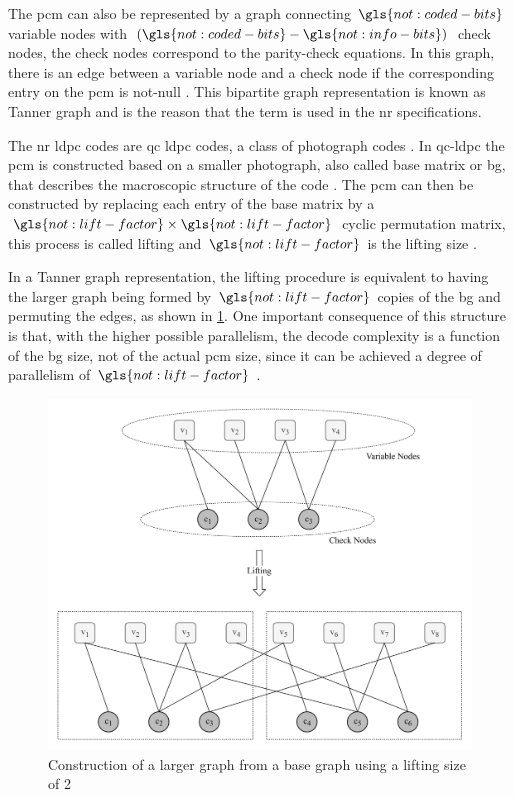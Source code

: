 The \gls{pcm} can also be represented by a graph connecting $\gls{not:coded-bits}$ variable nodes with $(\gls{not:coded-bits}-\gls{not:info-bits})$ check nodes, the check nodes correspond to the parity-check equations.
%
In this graph, there is an edge between a variable node and a check node if the corresponding entry on the \gls{pcm} is not-null \cite{Richardson2018}.
%
This bipartite graph representation is known as Tanner graph \cite{TannerGraph} and is the reason that the term  is used in the \gls{nr} specifications.
%


The \gls{nr} \gls{ldpc} codes are \gls{qc} \gls{ldpc} codes, a class of photograph codes \cite{bae_abotabl_lin_song_lee_2019}.
%
In \gls{qc}-\gls{ldpc} the \gls{pcm} is constructed based on a smaller photograph, also called base matrix or \gls{bg}, that describes the macroscopic structure of the code \cite{Richardson2018}.
%
The \gls{pcm} can then be constructed by replacing each entry of the base matrix by a $\gls{not:lift-factor} \times \gls{not:lift-factor} $ cyclic permutation matrix, this process is called lifting and $\gls{not:lift-factor}$ is the lifting size \cite{AliZaidi632018}.


In a Tanner graph representation, the lifting procedure is equivalent to having the larger graph being formed by $\gls{not:lift-factor}$ copies of the \gls{bg} and permuting the edges, as shown in \ref{fig:graph-lifting}.
%
One important consequence of this structure is that, with the higher possible parallelism, the decode complexity is a function of the \gls{bg} size, not of the actual \gls{pcm} size, since it can be achieved a degree of parallelism of $\gls{not:lift-factor}$ \cite{bae_abotabl_lin_song_lee_2019}.

\begin{figure}[htbp]
\includegraphics[width=\columnwidth]{figures/chp_theory/tanner_drawio.pdf}
\caption{Construction of a larger graph from a base graph using a lifting size of 2}
\label{fig:graph-lifting}
\end{figure}


